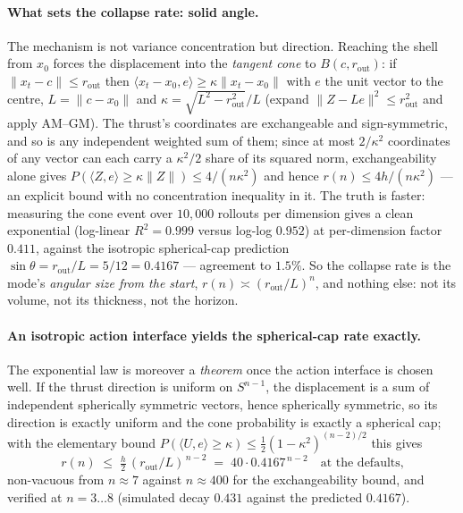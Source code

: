 \documentclass[11pt]{article}
\theoremstyle{remark}
\begin{document}
\paragraph{What sets the collapse rate: solid angle.} The mechanism is
not variance concentration but direction. Reaching the shell from $x_0$
forces the displacement into the \emph{tangent cone} to $B(c,
r_{\mathrm{out}})$: if $\lVert x_t - c\rVert \le r_{\mathrm{out}}$ then
$\langle x_t - x_0, e\rangle \ge \kappa \lVert x_t - x_0 \rVert$ with
$e$ the unit vector to the centre, $L = \lVert c - x_0\rVert$ and
$\kappa = \sqrt{L^2 - r_{\mathrm{out}}^2}/L$ (expand
$\lVert Z - Le\rVert^2 \le r_{\mathrm{out}}^2$ and apply AM--GM). The
thrust's coordinates are exchangeable and sign-symmetric, and so is any
independent weighted sum of them; since at most $2/\kappa^2$ coordinates
of any vector can each carry a $\kappa^2/2$ share of its squared norm,
exchangeability alone gives $P(\langle Z, e\rangle \ge \kappa\lVert
Z\rVert) \le 4/(n\kappa^2)$ and hence $r(n) \le 4h/(n\kappa^2)$ --- an
explicit bound with no concentration inequality in it. The truth is
faster: measuring the cone event over $10{,}000$ rollouts per dimension
gives a clean exponential (log-linear $R^2 = 0.999$ versus log-log
$0.952$) at per-dimension factor $0.411$, against the isotropic
spherical-cap prediction $\sin\theta = r_{\mathrm{out}}/L = 5/12 =
0.4167$ --- agreement to $1.5\%$. So the collapse rate is the mode's
\emph{angular size from the start}, $r(n) \asymp (r_{\mathrm{out}}/L)^n$,
and nothing else: not its volume, not its thickness, not the horizon.

\paragraph{An isotropic action interface yields the spherical-cap rate
exactly.} The exponential law is moreover a \emph{theorem} once the
action
interface is chosen well. If the thrust direction is uniform on
$S^{n-1}$, the displacement is a sum of independent spherically
symmetric vectors, hence spherically symmetric, so its direction is
exactly uniform and the cone probability is exactly a spherical cap;
with the elementary bound
$P(\langle U, e\rangle \ge \kappa) \le \tfrac12 (1-\kappa^2)^{(n-2)/2}$
this gives
\[
  r(n) \;\le\; \tfrac{h}{2}\,(r_{\mathrm{out}}/L)^{\,n-2}
  \;=\; 40 \cdot 0.4167^{\,n-2}
  \quad\text{at the defaults,}
\]
non-vacuous from $n \approx 7$ against $n \approx 400$ for the
exchangeability bound, and verified at $n = 3\ldots8$ (simulated decay
$0.431$ against the predicted $0.4167$).
\end{document}
